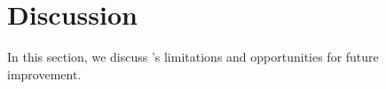 

\section{Discussion}
\label{sec:future}

In this section, we discuss \quicksand's limitations and opportunities for future improvement.

